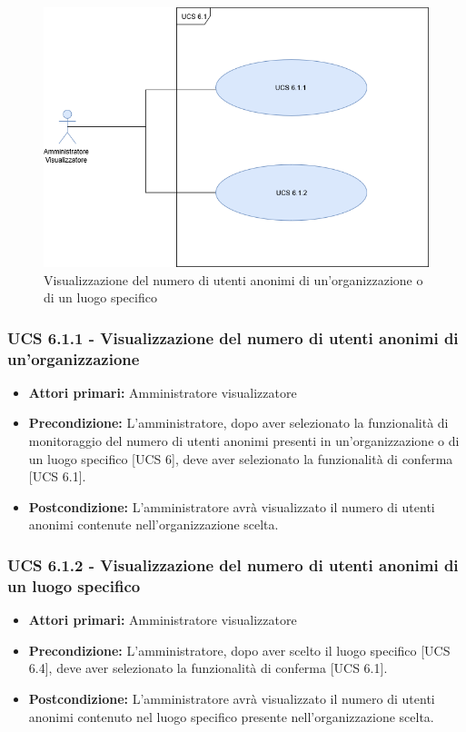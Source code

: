 \begin{figure}[h]
	\centering
	\includegraphics[scale=0.3]{sezioni/UseCase/Immagini/UCS6_1.png}
	\caption{Visualizzazione del numero di utenti anonimi di un'organizzazione o di un luogo specifico}
\end{figure}


\subsubsection{UCS 6.1.1 - Visualizzazione del numero di utenti anonimi di un'organizzazione}
\begin{itemize}
	\item \textbf{Attori primari:} Amministratore visualizzatore
	\item \textbf{Precondizione:} L'amministratore, dopo aver selezionato la funzionalità di monitoraggio del numero di utenti anonimi presenti in un'organizzazione o di un luogo specifico [UCS 6], deve aver selezionato la funzionalità di conferma [UCS 6.1].
	\item \textbf{Postcondizione:} L'amministratore avrà visualizzato il numero di utenti anonimi contenute nell'organizzazione scelta.
\end{itemize}

\subsubsection{UCS 6.1.2 - Visualizzazione del numero di utenti anonimi di un luogo specifico}
\begin{itemize}
	\item \textbf{Attori primari:} Amministratore visualizzatore
	\item \textbf{Precondizione:} L'amministratore, dopo aver scelto il luogo specifico [UCS 6.4], deve aver selezionato la funzionalità di conferma [UCS 6.1].
	\item \textbf{Postcondizione:} L'amministratore avrà visualizzato il numero di utenti anonimi contenuto nel luogo specifico presente nell'organizzazione scelta.
\end{itemize}



